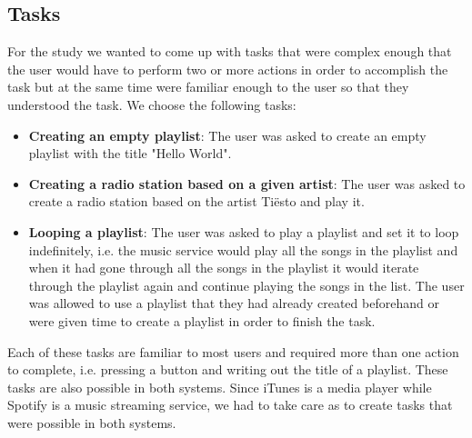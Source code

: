 \documentclass[11pt]{article}
\begin{document}
\subsection{Tasks}
For the study we wanted to come up with tasks that were complex enough that the user would have to perform two or more actions in order to accomplish the task but at the same time were familiar enough to the user so that they understood the task. We choose the following tasks:
\begin{itemize}
    \item \textbf{Creating an empty playlist}: The user was asked to create an empty playlist with the title "Hello World".
    \item \textbf{Creating a radio station based on a given artist}: The user was asked to create a radio station based on the artist Ti\"{e}sto and play it.
    \item \textbf{Looping a playlist}: The user was asked to play a playlist and set it to loop indefinitely, i.e. the music service would play all the songs in the playlist and when it had gone through all the songs in the playlist it would iterate through the playlist again and continue playing the songs in the list. The user was allowed to use a playlist that they had already created beforehand or were given time to create a playlist in order to finish the task.  
\end{itemize} 

Each of these tasks are familiar to most users and required more than one action to complete, i.e. pressing a button and writing out the title of a playlist. These tasks are also possible in both systems. Since iTunes is a media player while Spotify is a music streaming service, we had to take care as to create tasks that were possible in both systems. 
\end{document}

